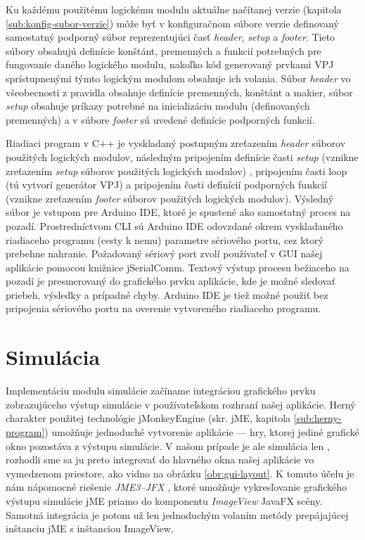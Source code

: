 Ku každému použitému logickému modulu aktuálne načítanej verzie (kapitola \ref{sub:konfig-subor-verzie}) môže byť v konfiguračnom súbore verzie definovaný samostatný podporný súbor reprezentujúci časť \textit{header}, \textit{setup} a \textit{footer}. Tieto súbory obsahujú definície konštánt, premenných a funkcií potrebných pre fungovanie daného logického modulu, nakoľko kód generovaný prvkami VPJ sprístupnenými týmto logickým modulom obsahuje ich volania. Súbor \textit{header} vo všeobecnosti z pravidla obsahuje definície premenných, konštánt a makier, súbor \textit{setup} obsahuje príkazy potrebné na inicializáciu modulu (definovaných premenných) a v súbore \textit{footer} sú uvedené definície podporných funkcií.

Riadiaci program v C++ je vyskladaný postupným zreťazením \textit{header} súborov použitých logických modulov, následným pripojením definície časti \textit{setup} (vznikne zreťazením \textit{setup} súborov použitých logických modulov) , pripojením časti loop (tú vytvorí generátor VPJ) a pripojením časti definícií podporných funkcií (vznikne zreťazením \textit{footer} súborov použitých logických modulov). Výsledný súbor je vstupom pre Arduino IDE, ktoré je spustené ako samostatný proces na pozadí. Prostredníctvom CLI sú Arduino IDE odovzdané okrem vyskladaného riadiaceho programu (cesty k nemu) parametre sériového portu, cez ktorý prebehne nahranie. Požadovaný sériový port zvolí používateľ v GUI našej aplikácie pomocou knižnice jSerialComm. Textový výstup procesu bežiaceho na pozadí je presmerovaný do grafického prvku aplikácie, kde je možné sledovať priebeh, výsledky a prípadné chyby. Arduino IDE je tiež možné použiť bez pripojenia sériového portu na overenie vytvoreného riadiaceho programu.


\section{Simulácia}
Implementáciu modulu simulácie začíname integráciou grafického prvku zobrazujúceho výstup simulácie v používateľskom rozhraní našej aplikácie. Herný charakter použitej technológie jMonkeyEngine (skr. jME, kapitola \ref{sub:herny-program}) umožňuje jednoduché vytvorenie aplikácie --- hry, ktorej jediné grafické okno pozostáva z výstupu simulácie. V našom prípade je ale simulácia len , rozhodli sme sa ju preto integrovať do hlavného okna našej aplikácie vo vymedzenom priestore, ako vidno na obrázku \ref{obr:gui-layout}. K tomuto účelu je nám nápomocné riešenie \textit{JME3--JFX} \cite{jmejfx}, ktoré umožňuje vykresľovanie grafického výstupu simulácie jME priamo do komponentu \textit{ImageView} JavaFX scény. Samotná integrácia je potom už len jednoduchým volaním metódy prepájajúcej inštanciu jME s inštanciou ImageView.

